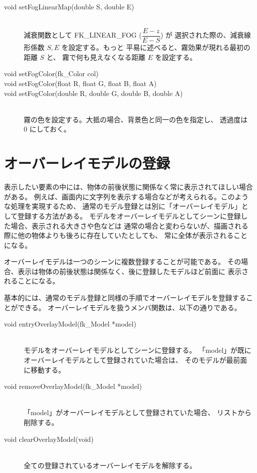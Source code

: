 \begin{description}
 \item[\hspace*{0.6cm}void setFogLinearMap(double S, double E)] ~ \\
	減衰関数として FK\_LINEAR\_FOG (\(\dfrac{E - z}{E - S}\)) が
	選択された際の、減衰線形係数 \(S, E\) を設定する。もっと
	平易に述べると、霧効果が現れる最初の距離 \(S\) と、
	霧で何も見えなくなる距離 \(E\) を設定する。\\

 \item[\hspace*{0.6cm}void setFogColor(fk\_Color col)]
 \item[\hspace*{0.6cm}void setFogColor(float R, float G, float B, float A)]
 \item[\hspace*{0.6cm}void setFogColor(double R, double G, double B, double A)]
	~ \\
	霧の色を設定する。大抵の場合、背景色と同一の色を指定し、
	透過度は 0 にしておく。
\end{description}

\section{オーバーレイモデルの登録}

表示したい要素の中には、物体の前後状態に関係なく常に表示されてほしい場合がある。
例えば、画面内に文字列を表示する場合などが考えられる。このような処理を実現するため、
通常のモデル登録とは別に「オーバーレイモデル」として登録する方法がある。
モデルをオーバーレイモデルとしてシーンに登録した場合、表示される大きさや色などは
通常の場合と変わらないが、描画される際に他の物体よりも後ろに存在していたとしても、
常に全体が表示されることになる。

オーバーレイモデルは一つのシーンに複数登録することが可能である。
その場合、表示は物体の前後状態は関係なく、後に登録したモデルほど前面に
表示されることになる。

基本的には、通常のモデル登録と同様の手順でオーバーレイモデルを登録することができる。
オーバーレイモデルを扱うメンバ関数は、以下の通りである。
\begin{description}
\item[void entryOverlayModel(fk\_Model *model)] ~ \\
	モデルをオーバーレイモデルとしてシーンに登録する。
	「model」が既にオーバーレイモデルとして登録されていた場合は、
	そのモデルが最前面に移動する。\\

\item[void removeOverlayModel(fk\_Model *model)] ~ \\
	「model」がオーバーレイモデルとして登録されていた場合、
	リストから削除する。\\

\item[void clearOverlayModel(void)] ~ \\
	全ての登録されているオーバーレイモデルを解除する。
\end{description}

